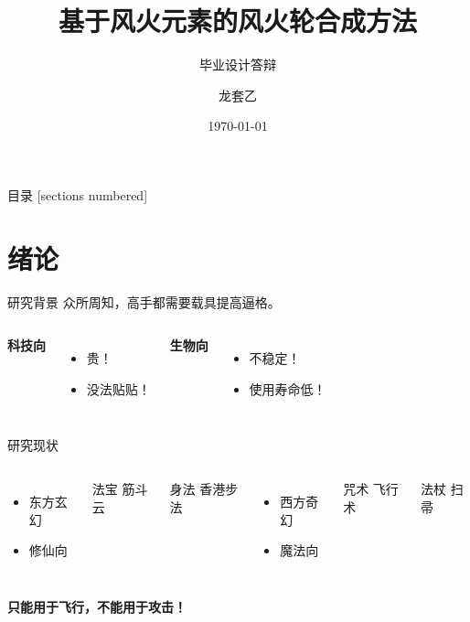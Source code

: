 \documentclass[aspectratio=32,fontset=fandol]{beamer}
\title{基于风火元素的风火轮合成方法}
\subtitle{毕业设计答辩}
\date{\today}
\author{龙套乙}
\institute{霍格沃茨学院\\魔法炼金学\\指导教师：路人甲}
\begin{document}
	\maketitle
	\begin{frame}{目录}
		[sections numbered]
		\tableofcontents[hideallsubsections]
	\end{frame}
	
	\section{绪论}
	
	\begin{frame}{研究背景}
	众所周知，高手都需要载具提高逼格。\cite{rider}
			\begin{columns}[T,onlytextwidth]
				\textbf{科技向}
				\begin{itemize}
					\item 贵！
					\item 没法贴贴！
				\end{itemize}
				\textbf{生物向}
				\begin{itemize}
					\item 不稳定！
					\item 使用寿命低！
			\end{itemize}
			\end{columns}
		\end{frame}
	
	
	\begin{frame}{研究现状}
		\begin{columns}[T,onlytextwidth]
			\begin{itemize}				
				\item 东方玄幻
				\item 修仙向
			\end{itemize}
			\begin{block}{法宝}
			    筋斗云
			\end{block}
			
			\begin{block}{身法}
                香港步法
			\end{block}
			\begin{itemize}				
				\item 西方奇幻
				\item 魔法向			
			\end{itemize}
			\begin{block}{咒术}
			    飞行术	
			\end{block}
			\begin{block}{法杖}
				扫帚
			\end{block}
		\end{columns}
	\begin{center}\textbf{只能用于飞行，不能用于攻击！}\end{center}
	\end{frame}
	
\end{document}
